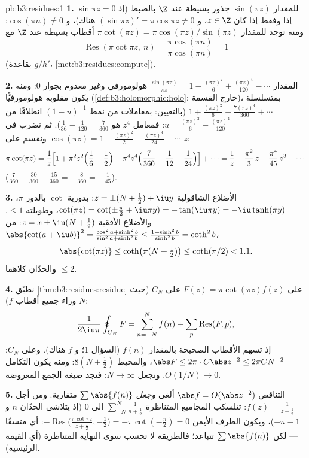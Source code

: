 \begin{solution}{pb:b3:residues:1}
\textbf{1.} للمقدار $\sin(\pi z)$ جذور بسيطة عند $\Z$ بالضبط
(إذ $\sin\pi z = 0$ إذا وفقط إذا كان $z \in \Z$، و $(\sin\pi z)' = \pi\cos\pi
z \neq 0$
هناك)، و $\cos(\pi n) \neq 0$: ومنه توجد للمقدار $\pi\cot(\pi z) =
\pi\cos(\pi z)/\sin(\pi z)$ أقطاب بسيطة عند $\Z$ مع
\[
\operatorname{Res}(\pi\cot\pi z,\ n)
= \frac{\pi\cos(\pi n)}{\pi\cos(\pi n)} = 1
\]
(بقاعدة $g/h'$، \cref{met:b3:residues:compute}).

\textbf{2.} المقدار $\frac{\sin(\pi z)}{\pi z} = 1 - \frac{(\pi z)^2}6
+ \frac{(\pi z)^4}{120} - \cdots$ هولومورفي وغير معدوم بجوار $0$:
ومنه يكون مقلوبه هولومورفيًّا (\cref{def:b3:holomorphic:holo}: خارج القسمة)،
بمتسلسلة $1 +
\frac{(\pi z)^2}{6} + \frac{7(\pi z)^4}{360} + \cdots$ (بالتعيين: بمعاملات من نمط $(1 - u)^{-1}$
انطلاقًا من $u =
\frac{(\pi z)^2}6 - \frac{(\pi z)^4}{120}$: فمعامل $z^4$ هو $\frac1{36} - \frac1{120} = \frac{7}{360}$). ثم نضرب في
$\cos(\pi z) = 1 - \frac{(\pi z)^2}2 + \frac{(\pi
z)^4}{24} - \cdots$ ونقسم على $z$:
\[
\pi\cot(\pi z) = \frac1z\Bigl[1 + \pi^2z^2\Bigl(\frac16 -
\frac12\Bigr) + \pi^4z^4\Bigl(\frac7{360} - \frac1{12} +
\frac1{24}\Bigr)\Bigr] + \cdots
= \frac1z - \frac{\pi^2}3\,z - \frac{\pi^4}{45}\,z^3 -
\cdots
\]
($\frac7{360} - \frac{30}{360} + \frac{15}{360} =
-\frac8{360} = -\frac1{45}$).

\textbf{3.} الأضلاع الشاقولية $z = \pm(N + \frac12) + \iu y$: بدورية $\cot$ بالدور
$\pi$، $\cot(\pi z) = \cot(\pm\frac\pi2
+ \iu\pi y) = -\tan(\iu\pi y) = -\iu\tanh(\pi y)$، وطويلته $\leq 1$. والأضلاع الأفقية $z = x \pm \iu(N + \frac12)$: من
$\abs{\cot(a + \iu b)}^2 = \frac{\cos^2a +
\sinh^2b}{\sin^2a + \sinh^2b} \leq \frac{1 +
\sinh^2b}{\sinh^2b} = \coth^2 b$،
\[
\abs{\cot(\pi z)} \leq \coth\bigl(\pi(N + \tfrac12)\bigr)
\leq \coth(\pi/2) < 1.1 .
\]
والحدّان كلاهما $\leq 2$.

\textbf{4.} نطبّق \cref{thm:b3:residues:residue} على $F(z) =
\pi\cot(\pi z)f(z)$ على $C_N$ (حيث $N$
وراء جميع أقطاب $f$):
\[
\frac1{2\iu\pi}\oint_{C_N}F = \sum_{n=-N}^{N}f(n) +
\sum_p\operatorname{Res}(F, p),
\]
إذ تسهم الأقطاب الصحيحة بالمقدار $f(n)$ (السؤال 1؛ و $f$
 هناك). وعلى $C_N$: $\abs F \leq 2\pi\cdot
C\abs z^{-2} \leq 2\pi C N^{-2}$، والمحيط $8(N +
\frac12)$: ومنه
يكون التكامل $O(1/N) \to 0$. ونجعل $N \to
\infty$: فنجد صيغة الجمع
المعروضة.

\textbf{5.} التناقص $\abs f = O(\abs z^{-2})$ ألغى  \emph{وجعل}
$\sum\abs{f(n)}$ متقاربة. ومن أجل $f(z) = \frac1{z + \frac12}$: تتلسكب المجاميع
المتناظرة $\sum_{-N}^N\frac1{n + \frac12}$ إلى $0$ (إذ يتلاشى الحدّان $n$ و $-n - 1$)،
ويكون الطرف الأيمن $-\operatorname{Res}\bigl(\frac{\pi\cot\pi z}{z + \frac12},
-\frac12\bigr) = -\pi\cot(-\frac\pi2) = 0$: أي متسقًا --- لكن $\sum\abs{f(n)}$
تتباعد؛ فالطريقة لا تحسب سوى النهاية المتناظرة (أي القيمة
الرئيسية).


\end{solution}
